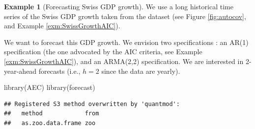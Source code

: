 \documentclass[
  12pt,
]{book}
\newenvironment{Shaded}{\begin{snugshade}}{\end{snugshade}}
\newcommand{\FunctionTok}[1]{\textcolor[rgb]{0.00,0.00,0.00}{#1}}
\newcommand{\NormalTok}[1]{#1}
\theoremstyle{definition}
\theoremstyle{definition}
\newtheorem{example}{Example}[chapter]
\theoremstyle{definition}
\theoremstyle{definition}
\theoremstyle{remark}
\begin{document}
\begin{example}[Forecasting Swiss GDP growth]
\protect\hypertarget{exm:SwissOutOfSample}{}\label{exm:SwissOutOfSample}We use a long historical time series of the Swiss GDP growth taken from the \citet{JST_2017} dataset (see Figure \ref{fig:autocov}, and Example \ref{exm:SwissGrowthAIC}).

We want to forecast this GDP growth. We envision two specifications : an AR(1) specification (the one advocated by the AIC criteria, see Example \ref{exm:SwissGrowthAIC}), and an ARMA(2,2) specification. We are interested in 2-year-ahead forecasts (i.e., \(h=2\) since the data are yearly).

\begin{Shaded}
\begin{Highlighting}[]
\FunctionTok{library}\NormalTok{(AEC)}
\FunctionTok{library}\NormalTok{(forecast)}
\end{Highlighting}
\end{Shaded}

\begin{verbatim}
## Registered S3 method overwritten by 'quantmod':
##   method            from
##   as.zoo.data.frame zoo
\end{verbatim}


\end{example}
\end{document}
